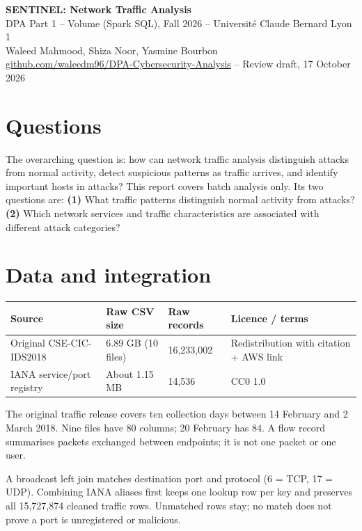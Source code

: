 \documentclass[10pt,a4paper]{article}
\begin{document}
\begin{center}
{\Large\bfseries SENTINEL: Network Traffic Analysis}\\[2pt]
{\small DPA Part 1 -- Volume (Spark SQL), Fall 2026 -- Universit\'e Claude Bernard Lyon 1}\\[2pt]
Waleed Mahmood, Shiza Noor, Yasmine Bourbon\\[2pt]
{\small\href{https://github.com/waleedm96/DPA-Cybersecurity-Analysis}{github.com/waleedm96/DPA-Cybersecurity-Analysis} -- Review draft, 17 October 2026}
\end{center}
\vspace{-5pt}

\section{Questions}
The overarching question is: how can network traffic analysis distinguish attacks from normal activity, detect suspicious patterns as traffic arrives, and identify important hosts in attacks? This report covers batch analysis only. Its two questions are:
\textbf{(1)} What traffic patterns distinguish normal activity from attacks?
\textbf{(2)} Which network services and traffic characteristics are associated with different attack categories?

\section{Data and integration}
\begin{center}\small
\begin{tabular}{@{}llll@{}}
\toprule
Source & Raw CSV size & Raw records & Licence / terms \\
\midrule
Original CSE-CIC-IDS2018 \cite{dataset1} & 6.89 GB (10 files) & 16,233,002 & Redistribution with citation + AWS link \\
IANA service/port registry \cite{dataset2} & About 1.15 MB & 14,536 & CC0 1.0 \\
\bottomrule
\end{tabular}
\end{center}
The original traffic release covers ten collection days between 14 February and 2 March 2018. Nine files have 80 columns; 20 February has 84. A flow record summarises packets exchanged between endpoints; it is not one packet or one user.

A broadcast left join matches destination port and protocol (6 = TCP, 17 = UDP). Combining IANA aliases first keeps one lookup row per key and preserves all 15,727,874 cleaned traffic rows. Unmatched rows stay; no match does not prove a port is unregistered or malicious.
\end{document}
